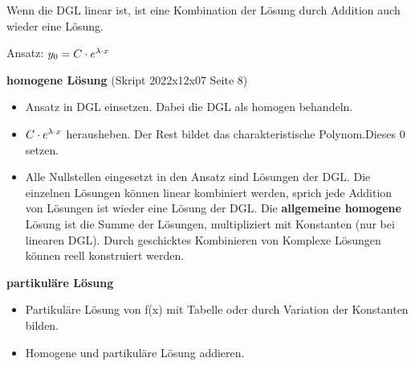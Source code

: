 
Wenn die DGL linear ist, ist eine Kombination der Lösung durch Addition auch wieder eine Lösung.

Ansatz: $y_0=C\cdot e^{\lambda \cdot x}$

\textbf{homogene Lösung} (Skript 2022x12x07 Seite 8)
\begin{itemize}
    \item Ansatz in DGL einsetzen. Dabei die DGL als homogen behandeln.
    \item $C\cdot e^{\lambda \cdot x}$ herausheben. Der Rest bildet das charakteristische Polynom.Dieses 0 setzen.
    \item Alle Nullstellen eingesetzt in den Ansatz sind Lösungen der DGL. Die einzelnen Lösungen können linear kombiniert werden, sprich jede Addition von Lösungen ist wieder eine Lösung der DGL. Die \textbf{allgemeine homogene} Lösung ist die Summe der Lösungen, multipliziert mit Konstanten (nur bei linearen DGL). Durch geschicktes Kombinieren von Komplexe Lösungen können reell konstruiert werden.
\end{itemize}

\textbf{partikuläre Lösung}
\begin{itemize}
    \item Partikuläre Lösung von f(x) mit Tabelle oder durch Variation der Konstanten bilden.
    \item Homogene und partikuläre Lösung addieren.    
\end{itemize}



